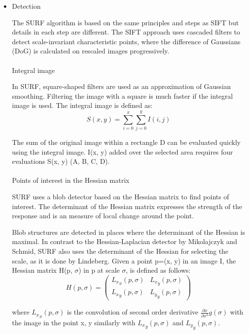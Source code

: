 \documentclass[12pt]{article}
\begin{document}
\begin{itemize}
	
	\item Detection
	
	The SURF algorithm is based on the same principles and steps as SIFT but details in each step are different. The SIFT approach uses cascaded filters to detect scale-invariant characteristic points, where the difference of Gaussians (DoG) is calculated on rescaled images progressively.
	\paragraph{}
	\subitem Integral image
	
	In SURF, square-shaped filters are used as an approximation of Gaussian smoothing. Filtering the image with a square is much faster if the integral image is used. The integral image is defined as:
\begin{equation}
S(x, y)=\sum\limits_{i=0}^x \sum\limits_{j=0}^y  I(i,j)
\end{equation}

The sum of the original image within a rectangle D can be evaluated quickly using the integral image. I(x, y) added over the selected area requires four evaluations S(x, y) (A, B, C, D).	
	\paragraph{}
	\subitem Points of interest in the Hessian matrix
	
	SURF uses a blob detector based on the Hessian matrix to find points of interest. The determinant of the Hessian matrix expresses the strength of the response and is an measure of local change around the point.

Blob structures are detected in places where the determinant of the Hessian is maximal. In contrast to the Hessian-Laplacian detector by Mikolajczyk and Schmid, SURF also uses the determinant of the Hessian for selecting the scale, as it is done by Lindeberg. Given a point p=(x, y) in an image I, the Hessian matrix H(p, $\sigma$) in p at scale $\sigma$, is defined as follows:
$$H(p,\sigma)=\begin{pmatrix}
	{L_x}_x(p,\sigma)& {L_x}_y(p,\sigma)\\
	{L_x}_y(p,\sigma)& {L_y}_y(p,\sigma)
\end{pmatrix}$$

where ${L_x}_x(p,\sigma)$ is the convolution of second order derivative $\frac{\partial x}{\partial x^2} g(\sigma)$ with the image in the point x, y similarly with ${L_x}_y(p,\sigma)$ and ${L_y}_y(p,\sigma)$.


\end{itemize}
\end{document}
